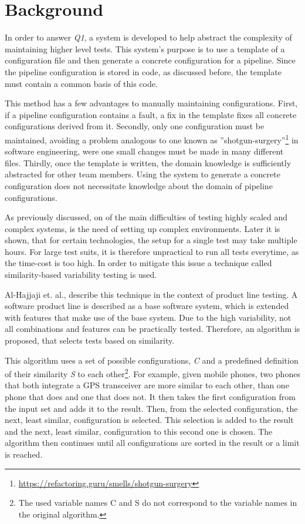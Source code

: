 
\chapter{Background}\label{ch:background}

In order to answer \textit{Q1}, a system is developed to help abstract the complexity of maintaining higher level tests.
This system's purpose is to use a template of a configuration file and then generate a concrete configuration for a pipeline.
Since the pipeline configuration is stored in code, as discussed before, the template must contain a common basis of this code.

This method has a few advantages to manually maintaining configurations.
First, if a pipeline configuration contains a fault, a fix in the template fixes all concrete configurations derived from it.
Secondly, only one configuration must be maintained, avoiding a problem analogous to one known as ''shotgun-surgery''\footnote{\url{https://refactoring.guru/smells/shotgun-surgery}} in software engineering, were one small changes must be made in many different files.
Thirdly, once the template is written, the domain knowledge is sufficiently abstracted for other team members.
Using the system to generate a concrete configuration does not necessitate knowledge about the domain of pipeline configurations.

As previously discussed, on of the main difficulties of testing highly scaled and complex systems, is the need of setting up complex environments.
Later it is shown, that for certain technologies, the setup for a single test may take multiple hours.
For large test suits, it is therefore unpractical to run all tests everytime, as the time-cost is too high.
In order to mitigate this issue a technique called similarity-based variability testing is used.

Al-Hajjaji et. al., describe this technique in the context of product line testing\cite{SimilarityBasedPrioritizationInSoftwareProductLineTesting}.
A software product line is described as a base software system, which is extended with features that make use of the base system.
Due to the high variability, not all combinations and features can be practically tested.
Therefore, an algorithm is proposed, that selects tests based on similarity.

This algorithm uses a set of possible configurations, \textit{C} and a predefined definition of their similarity \textit{S} to each other\footnote{The used variable names C and S do not correspond to the variable names in the original algorithm.}.
For example, given mobile phones, two phones that both integrate a GPS transceiver are more similar to each other, than one phone that does and one that does not.
It then takes the first configuration from the input set and adds it to the result.
Then, from the selected configuration, the next, least similar, configuration is selected.
This selection is added to the result and the next, least similar, configuration to this second one is chosen.
The algorithm then continues until all configurations are sorted in the result or a limit is reached.

